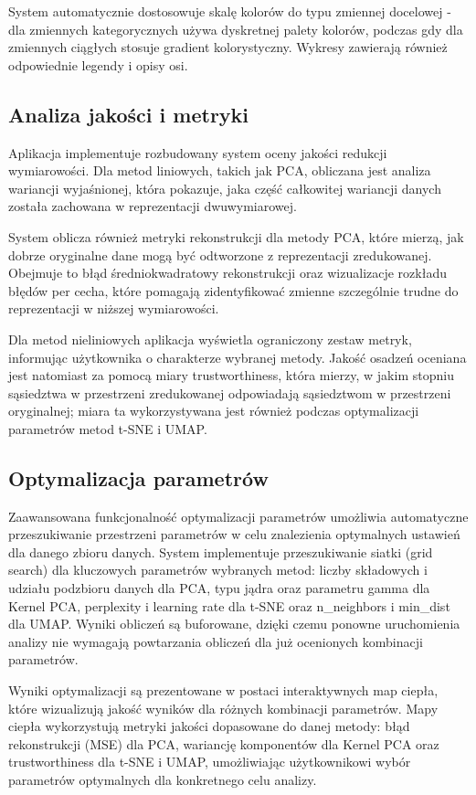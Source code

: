 \documentclass[a4paper, 12pt]{article}
\begin{document}
System automatycznie dostosowuje skalę kolorów do typu zmiennej docelowej - dla zmiennych kategorycznych używa dyskretnej palety kolorów, podczas gdy dla zmiennych ciągłych stosuje gradient kolorystyczny. Wykresy zawierają również odpowiednie legendy i opisy osi.

\subsection{Analiza jakości i metryki}

Aplikacja implementuje rozbudowany system oceny jakości redukcji wymiarowości. Dla metod liniowych, takich jak PCA, obliczana jest analiza wariancji wyjaśnionej, która pokazuje, jaka część całkowitej wariancji danych została zachowana w reprezentacji dwuwymiarowej.

System oblicza również metryki rekonstrukcji dla metody PCA, które mierzą, jak dobrze oryginalne dane mogą być odtworzone z reprezentacji zredukowanej. Obejmuje to błąd średniokwadratowy rekonstrukcji oraz wizualizacje rozkładu błędów per cecha, które pomagają zidentyfikować zmienne szczególnie trudne do reprezentacji w niższej wymiarowości.

Dla metod nieliniowych aplikacja wyświetla ograniczony zestaw metryk, informując użytkownika o charakterze wybranej metody. Jakość osadzeń oceniana jest natomiast za pomocą miary trustworthiness, która mierzy, w jakim stopniu sąsiedztwa w przestrzeni zredukowanej odpowiadają sąsiedztwom w przestrzeni oryginalnej; miara ta wykorzystywana jest również podczas optymalizacji parametrów metod t-SNE i UMAP.

\subsection{Optymalizacja parametrów}

Zaawansowana funkcjonalność optymalizacji parametrów umożliwia automatyczne przeszukiwanie przestrzeni parametrów w celu znalezienia optymalnych ustawień dla danego zbioru danych. System implementuje przeszukiwanie siatki (grid search) dla kluczowych parametrów wybranych metod: liczby składowych i udziału podzbioru danych dla PCA, typu jądra oraz parametru gamma dla Kernel PCA, perplexity i learning rate dla t-SNE oraz n\_neighbors i min\_dist dla UMAP. Wyniki obliczeń są buforowane, dzięki czemu ponowne uruchomienia analizy nie wymagają powtarzania obliczeń dla już ocenionych kombinacji parametrów.

Wyniki optymalizacji są prezentowane w postaci interaktywnych map ciepła, które wizualizują jakość wyników dla różnych kombinacji parametrów. Mapy ciepła wykorzystują metryki jakości dopasowane do danej metody: błąd rekonstrukcji (MSE) dla PCA, wariancję komponentów dla Kernel PCA oraz trustworthiness dla t-SNE i UMAP, umożliwiając użytkownikowi wybór parametrów optymalnych dla konkretnego celu analizy.
\end{document}
